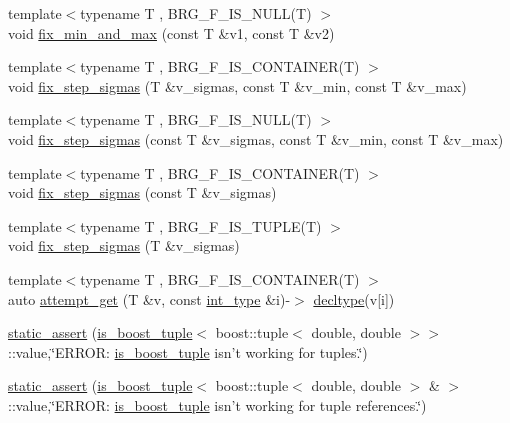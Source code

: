 \begin{DoxyCompactItemize}
\item 
{\footnotesize template$<$typename T , B\-R\-G\-\_\-\-F\-\_\-\-I\-S\-\_\-\-N\-U\-L\-L(\-T) $>$ }\\void \hyperlink{namespaceIceBRG_a084bf1186811c3fd362d52cf79e3948c}{fix\-\_\-min\-\_\-and\-\_\-max} (const T \&v1, const T \&v2)
\item 
{\footnotesize template$<$typename T , B\-R\-G\-\_\-\-F\-\_\-\-I\-S\-\_\-\-C\-O\-N\-T\-A\-I\-N\-E\-R(\-T) $>$ }\\void \hyperlink{namespaceIceBRG_ab5f6386b56383dcac68a24808b83fb6c}{fix\-\_\-step\-\_\-sigmas} (T \&v\-\_\-sigmas, const T \&v\-\_\-min, const T \&v\-\_\-max)
\item 
{\footnotesize template$<$typename T , B\-R\-G\-\_\-\-F\-\_\-\-I\-S\-\_\-\-N\-U\-L\-L(\-T) $>$ }\\void \hyperlink{namespaceIceBRG_aebcfb0c04e9854acc78a326c43785560}{fix\-\_\-step\-\_\-sigmas} (const T \&v\-\_\-sigmas, const T \&v\-\_\-min, const T \&v\-\_\-max)
\item 
{\footnotesize template$<$typename T , B\-R\-G\-\_\-\-F\-\_\-\-I\-S\-\_\-\-C\-O\-N\-T\-A\-I\-N\-E\-R(\-T) $>$ }\\void \hyperlink{namespaceIceBRG_a8e7080546dfa40b9457149562d7c81ed}{fix\-\_\-step\-\_\-sigmas} (const T \&v\-\_\-sigmas)
\item 
{\footnotesize template$<$typename T , B\-R\-G\-\_\-\-F\-\_\-\-I\-S\-\_\-\-T\-U\-P\-L\-E(\-T) $>$ }\\void \hyperlink{namespaceIceBRG_a0269eb85770d5903ad410f3732145184}{fix\-\_\-step\-\_\-sigmas} (T \&v\-\_\-sigmas)
\item 
{\footnotesize template$<$typename T , B\-R\-G\-\_\-\-F\-\_\-\-I\-S\-\_\-\-C\-O\-N\-T\-A\-I\-N\-E\-R(\-T) $>$ }\\auto \hyperlink{namespaceIceBRG_a7e4ad51abcee05e3f624b6c72ee38693}{attempt\-\_\-get} (T \&v, const \hyperlink{lib_2IceBRG__main_2common_8h_ac4de9d9335536ac22821171deec8d39e}{int\-\_\-type} \&i)-\/$>$ \hyperlink{namespaceIceBRG_a528e5024ecab03049320529180ae84a8}{decltype}(v\mbox{[}i\mbox{]})
\item 
\hyperlink{namespaceIceBRG_a7a9571fb7490674b0f8acd9256dcc932}{static\-\_\-assert} (\hyperlink{structIceBRG_1_1is__boost__tuple}{is\-\_\-boost\-\_\-tuple}$<$ boost\-::tuple$<$ double, double $>$$>$\-::value,\char`\"{}E\-R\-R\-O\-R\-: \hyperlink{structIceBRG_1_1is__boost__tuple}{is\-\_\-boost\-\_\-tuple} isn't working for tuples.\char`\"{})
\item 
\hyperlink{namespaceIceBRG_a7866cc13dddaaf3bd32ce393c500dee8}{static\-\_\-assert} (\hyperlink{structIceBRG_1_1is__boost__tuple}{is\-\_\-boost\-\_\-tuple}$<$ boost\-::tuple$<$ double, double $>$ \& $>$\-::value,\char`\"{}E\-R\-R\-O\-R\-: \hyperlink{structIceBRG_1_1is__boost__tuple}{is\-\_\-boost\-\_\-tuple} isn't working for tuple references.\char`\"{})
$$
\end{DoxyCompactItemize}
